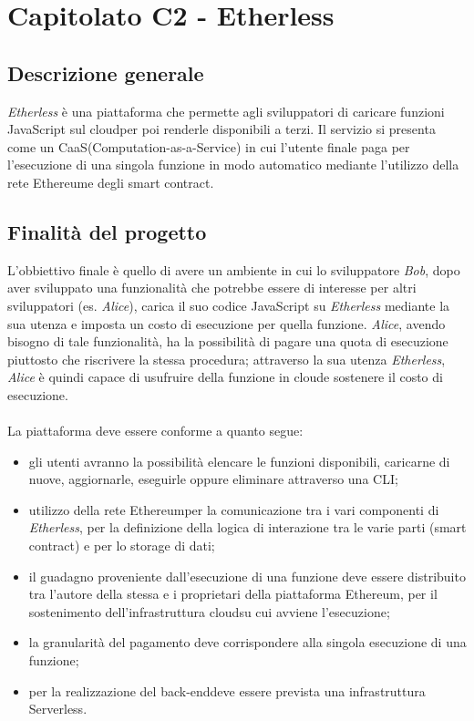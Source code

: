 \section{Capitolato C2 - Etherless}

\subsection{Descrizione generale}
\textit{Etherless} è una piattaforma che permette agli sviluppatori di caricare funzioni JavaScript sul cloud\glo per poi renderle disponibili a terzi. Il servizio si presenta come un CaaS\glo (Computation-as-a-Service) in cui l'utente finale paga per l'esecuzione di una singola funzione in modo automatico mediante l'utilizzo della rete Ethereum\glo e degli smart contract\glos. 
\subsection{Finalità del progetto}
L'obbiettivo finale è quello di avere un ambiente in cui lo sviluppatore \textit{Bob}, dopo aver sviluppato una funzionalità che potrebbe essere di interesse per altri sviluppatori (es. \textit{Alice}), carica il suo codice JavaScript su \textit{Etherless} mediante la sua utenza e imposta un costo di esecuzione per quella funzione. \textit{Alice}, avendo bisogno di tale funzionalità, ha la possibilità di pagare una quota di esecuzione piuttosto che riscrivere la stessa procedura; attraverso la sua utenza \textit{Etherless}, \textit{Alice} è quindi capace di usufruire della funzione in cloud\glo e sostenere il costo di esecuzione.
\\\\
La piattaforma deve essere conforme a quanto segue:
\begin{itemize}
	\item gli utenti avranno la possibilità elencare le funzioni disponibili,  caricarne di nuove, aggiornarle, eseguirle oppure eliminare attraverso una CLI\glos;
	\item utilizzo della rete Ethereum\glo per la comunicazione tra i vari componenti di \textit{Etherless}, per la definizione della logica di interazione tra le varie parti (smart contract\glos) e per lo storage di dati;
	\item il guadagno proveniente dall'esecuzione di una funzione deve essere distribuito tra l'autore della stessa e i proprietari della piattaforma Ethereum\glos, per il sostenimento dell'infrastruttura cloud\glo su cui avviene l'esecuzione;
	\item la granularità del pagamento deve corrispondere alla singola esecuzione di una funzione;
	\item per la realizzazione del back-end\glo deve essere prevista una infrastruttura Serverless\glos.
\end{itemize}

